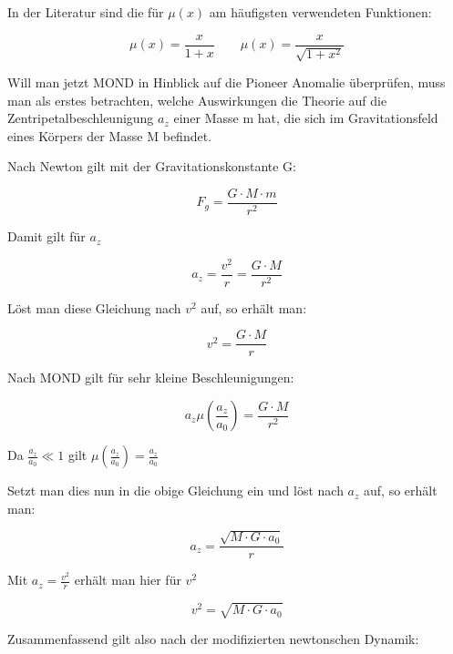 In der Literatur sind die f\"ur  $\mu (x)$ am h\"aufigsten verwendeten
Funktionen:

\begin{equation*}
\mu (x)=\frac{x}{1+x}
\qquad
\mu (x)=\frac{x}{\sqrt{1+x^{2}}}
\end{equation*}

Will man jetzt MOND in Hinblick auf die Pioneer Anomalie \cite{Turyshev2010}
\"uberpr\"ufen, muss man als erstes betrachten, welche Auswirkungen die
Theorie auf die Zentripetalbeschleunigung  $a_{z}$ einer Masse m hat,
die sich im Gravitationsfeld eines K\"orpers der Masse M befindet.

Nach Newton gilt mit der Gravitationskonstante G:

\begin{equation}
F_{g}=\frac{G\cdot {M\cdot m}}{r^{2}}
\end{equation}

Damit gilt f\"ur  $a_{z}$

\begin{equation}
a_{z}=\frac{v^{2}}{r}=\frac{G\cdot {M}}{r^{2}}
\end{equation}

L\"ost man diese Gleichung nach  $v^{2}$ auf, so erh\"alt man:

\begin{equation}
v^{2}=\frac{G\cdot M}{r}
\end{equation}

Nach MOND gilt f\"ur sehr kleine Beschleunigungen:

\begin{equation}
a_{z}\mu (\frac{a_{z}}{a_{0}})=\frac{G\cdot {M}}{r^{2}}
\end{equation}

Da  $\frac{a_{z}}{a_{0}}\ll 1$ gilt  $\mu
(\frac{a_{z}}{a_{0}})=\frac{a_{z}}{a_{0}}$

Setzt man dies nun in die obige Gleichung ein und l\"ost nach  $a_{z}$
auf, so erh\"alt man:

\begin{equation}
a_{z}=\frac{\sqrt{M\cdot G\cdot a_{0}}}{r}
\end{equation}

Mit  $a_{z}=\frac{v^{2}}{r}$ erh\"alt man hier f\"ur  $v^{2}$

\begin{equation}
v^{2}=\sqrt{M\cdot G\cdot a_{0}}
\end{equation}

Zusammenfassend gilt also nach der modifizierten newtonschen Dynamik:

